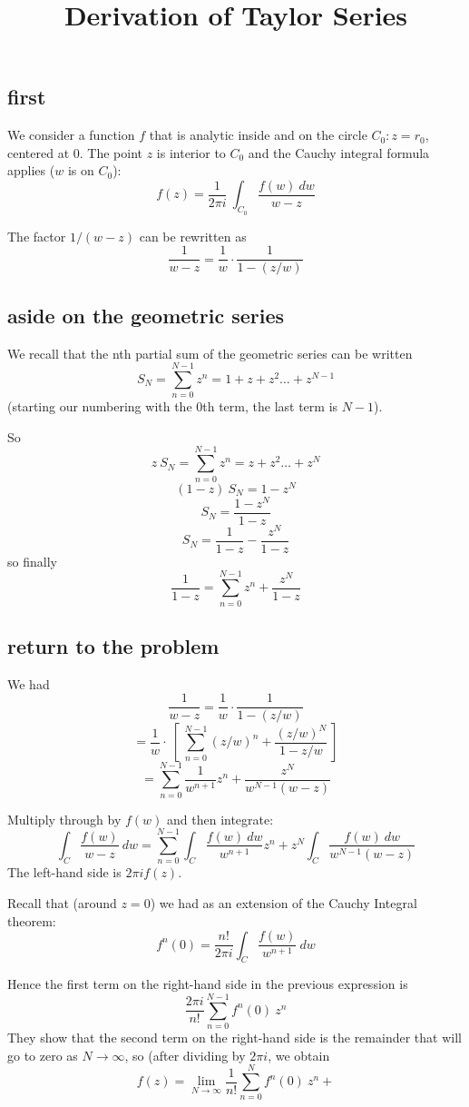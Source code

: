 \documentclass[11pt, oneside]{article}
\title{Derivation of Taylor Series}
\date{}
\begin{document}
\maketitle
\Large
\subsection*{first}
We consider a function $f$ that is analytic inside and on the circle $C_0:  z = r_0$, centered at $0$.  The point $z$ is interior to $C_0$ and the Cauchy integral formula applies ($w$ is on $C_0$):
\[ f(z) = \frac{1}{2 \pi i} \ \int_{C_0} \frac{f(w) \ dw}{w - z} \]

The factor $1/(w-z)$ can be rewritten as
\[ \frac{1}{w - z} = \frac{1}{w} \cdot \frac{1}{1 - (z/w)} \]

\subsection*{aside on the geometric series}
We recall that the nth partial sum of the geometric series can be written
\[ S_N = \sum_{n=0}^{N-1} z^n = 1 + z + z^2 \dots + z^{N-1} \]
(starting our numbering with the 0th term, the last term is $N-1$).

So
\[ z \ S_N = \sum_{n=0}^{N-1} z^n = z + z^2 \dots + z^{N} \]
\[ (1-z) \ S_N = 1 - z^N \]
\[ S_N = \frac{1 - z^{N}}{1 - z} \]
\[ S_N = \frac{1}{1-z} - \frac{z^{N}}{1 - z} \]
so finally
\[ \frac{1}{1 - z} = \sum_{n=0}^{N-1} z^n +  \frac{z^{N}}{1 - z} \]

\subsection*{return to the problem}
We had
\[ \frac{1}{w - z} = \frac{1}{w} \cdot \frac{1}{1 - (z/w)} \]
\[ = \frac{1}{w} \cdot \ [ \  \sum_{n=0}^{N-1} (z/w)^n +  \frac{(z/w)^{N}}{1 - z/w} \ ] \]
\[ = \sum_{n=0}^{N-1} \frac{1}{w^{n+1}} z^n +  \frac{z^{N}}{w^{N-1}(w - z)} \]

Multiply through by $f(w)$ and then integrate:
\[ \int_C \frac{f(w)}{w - z} \ dw  = \sum_{n=0}^{N-1} \int_C \frac{f(w) \ dw}{w^{n+1}} z^n +  z^{N} \int_C \frac{f(w) \ dw}{w^{N-1}(w - z)} \]
The left-hand side is $2 \pi i f(z)$.

Recall that (around $z = 0$) we had as an extension of the Cauchy Integral theorem:
\[ f^n(0) = \frac{n!}{2 \pi i} \int_C \frac{f(w)}{w^{n+1}} \ dw \]

Hence the first term on the right-hand side in the previous expression is
\[ \frac{2 \pi i}{n!} \sum_{n=0}^{N-1} f^n(0) \ z^n \]
They show that the second term on the right-hand side is the remainder that will go to zero as $N \rightarrow \infty$, so (after dividing by $2 \pi i$, we obtain  
\[ f(z) = \lim_{N \rightarrow \infty} \frac{1}{n!} \sum_{n=0}^{N} f^n(0) \ z^n + \]
\end{document}
